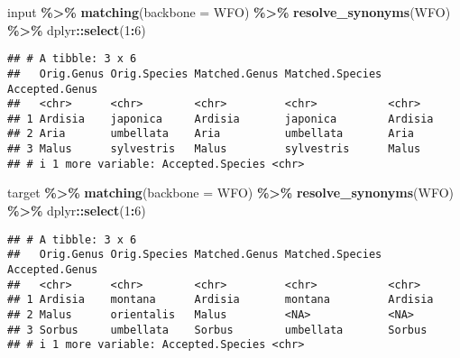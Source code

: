 \documentclass[
  11pt,
]{article}
\newenvironment{Shaded}{\begin{snugshade}}{\end{snugshade}}
\newcommand{\AttributeTok}[1]{\textcolor[rgb]{0.13,0.29,0.53}{#1}}
\newcommand{\DecValTok}[1]{\textcolor[rgb]{0.00,0.00,0.81}{#1}}
\newcommand{\FunctionTok}[1]{\textcolor[rgb]{0.13,0.29,0.53}{\textbf{#1}}}
\newcommand{\NormalTok}[1]{#1}
\newcommand{\SpecialCharTok}[1]{\textcolor[rgb]{0.81,0.36,0.00}{\textbf{#1}}}
\newcommand{\StringTok}[1]{\textcolor[rgb]{0.31,0.60,0.02}{#1}}
\begin{document}
\small

\begin{Shaded}
\begin{Highlighting}[]
\NormalTok{input }\SpecialCharTok{\%\textgreater{}\%}
  \FunctionTok{matching}\NormalTok{(}\AttributeTok{backbone =} \StringTok{\textquotesingle{}WFO\textquotesingle{}}\NormalTok{) }\SpecialCharTok{\%\textgreater{}\%}
  \FunctionTok{resolve\_synonyms}\NormalTok{(}\StringTok{\textquotesingle{}WFO\textquotesingle{}}\NormalTok{) }\SpecialCharTok{\%\textgreater{}\%}
\NormalTok{  dplyr}\SpecialCharTok{::}\FunctionTok{select}\NormalTok{(}\DecValTok{1}\SpecialCharTok{:}\DecValTok{6}\NormalTok{)}
\end{Highlighting}
\end{Shaded}

\begin{verbatim}
## # A tibble: 3 x 6
##   Orig.Genus Orig.Species Matched.Genus Matched.Species Accepted.Genus
##   <chr>      <chr>        <chr>         <chr>           <chr>         
## 1 Ardisia    japonica     Ardisia       japonica        Ardisia       
## 2 Aria       umbellata    Aria          umbellata       Aria          
## 3 Malus      sylvestris   Malus         sylvestris      Malus         
## # i 1 more variable: Accepted.Species <chr>
\end{verbatim}

\begin{Shaded}
\begin{Highlighting}[]
\NormalTok{target }\SpecialCharTok{\%\textgreater{}\%}
  \FunctionTok{matching}\NormalTok{(}\AttributeTok{backbone =} \StringTok{\textquotesingle{}WFO\textquotesingle{}}\NormalTok{) }\SpecialCharTok{\%\textgreater{}\%}
  \FunctionTok{resolve\_synonyms}\NormalTok{(}\StringTok{\textquotesingle{}WFO\textquotesingle{}}\NormalTok{) }\SpecialCharTok{\%\textgreater{}\%}
\NormalTok{  dplyr}\SpecialCharTok{::}\FunctionTok{select}\NormalTok{(}\DecValTok{1}\SpecialCharTok{:}\DecValTok{6}\NormalTok{)}
\end{Highlighting}
\end{Shaded}

\begin{verbatim}
## # A tibble: 3 x 6
##   Orig.Genus Orig.Species Matched.Genus Matched.Species Accepted.Genus
##   <chr>      <chr>        <chr>         <chr>           <chr>         
## 1 Ardisia    montana      Ardisia       montana         Ardisia       
## 2 Malus      orientalis   Malus         <NA>            <NA>          
## 3 Sorbus     umbellata    Sorbus        umbellata       Sorbus        
## # i 1 more variable: Accepted.Species <chr>
\end{verbatim}
\end{document}
